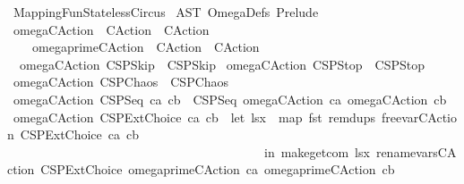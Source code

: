 %
\begin{isabellebody}%
%
%
\isadelimtheory
%
\endisadelimtheory
%
\isatagtheory
{}\isamarkupfalse%
\ MappingFunStatelessCircus\isanewline
{}\ AST\ OmegaDefs\ Prelude\isanewline
{}%
\endisatagtheory
{\isafoldtheory}%
%
\isadelimtheory
\isanewline
%
\endisadelimtheory
\ \isanewline
{}\isamarkupfalse%
\ omega{\isacharunderscore}CAction\ {\isacharcolon}{\isacharcolon}\ {\isachardoublequoteopen}CAction\ {\isasymRightarrow}\ CAction{\isachardoublequoteclose}\ \ \isanewline
\ \ \ \ omega{\isacharunderscore}prime{\isacharunderscore}CAction\ {\isacharcolon}{\isacharcolon}\ {\isachardoublequoteopen}CAction\ {\isasymRightarrow}\ CAction{\isachardoublequoteclose}\isanewline
{}\isanewline
\ \ {\isachardoublequoteopen}omega{\isacharunderscore}CAction\ CSPSkip\ {\isacharequal}\ CSPSkip{\isachardoublequoteclose}\isanewline
{\isacharbar}\ {\isachardoublequoteopen}omega{\isacharunderscore}CAction\ CSPStop\ {\isacharequal}\ CSPStop{\isachardoublequoteclose}\isanewline
{\isacharbar}\ {\isachardoublequoteopen}omega{\isacharunderscore}CAction\ CSPChaos\ {\isacharequal}\ CSPChaos{\isachardoublequoteclose}\isanewline
{\isacharbar}\ {\isachardoublequoteopen}omega{\isacharunderscore}CAction\ {\isacharparenleft}CSPSeq\ ca\ cb{\isacharparenright}\ {\isacharequal}\ {\isacharparenleft}CSPSeq\ {\isacharparenleft}omega{\isacharunderscore}CAction\ ca{\isacharparenright}\ {\isacharparenleft}omega{\isacharunderscore}CAction\ cb{\isacharparenright}{\isacharparenright}{\isachardoublequoteclose}\isanewline
{\isacharbar}\ {\isachardoublequoteopen}omega{\isacharunderscore}CAction\ {\isacharparenleft}CSPExtChoice\ ca\ cb{\isacharparenright}\ {\isacharequal}\ {\isacharparenleft}let\ lsx\ {\isacharequal}\ {\isacharparenleft}map\ fst\ {\isacharparenleft}remdups\ {\isacharparenleft}free{\isacharunderscore}var{\isacharunderscore}CAction\ {\isacharparenleft}CSPExtChoice\ ca\ cb{\isacharparenright}{\isacharparenright}{\isacharparenright}{\isacharparenright}\isanewline
\ \ \ \ \ \ \ \ \ \ \ \ \ \ \ \ \ \ \ \ \ \ \ \ \ \ \ \ \ \ \ \ \ \ \ \ \ \ \ \ \ in\ make{\isacharunderscore}get{\isacharunderscore}com\ lsx\ {\isacharparenleft}rename{\isacharunderscore}vars{\isacharunderscore}CAction\ {\isacharparenleft}CSPExtChoice\ {\isacharparenleft}omega{\isacharunderscore}prime{\isacharunderscore}CAction\ ca{\isacharparenright}\ {\isacharparenleft}omega{\isacharunderscore}prime{\isacharunderscore}CAction\ cb{\isacharparenright}{\isacharparenright}{\isacharparenright}{\isacharparenright}{\isachardoublequoteclose}\isanewline

\end{isabellebody}
